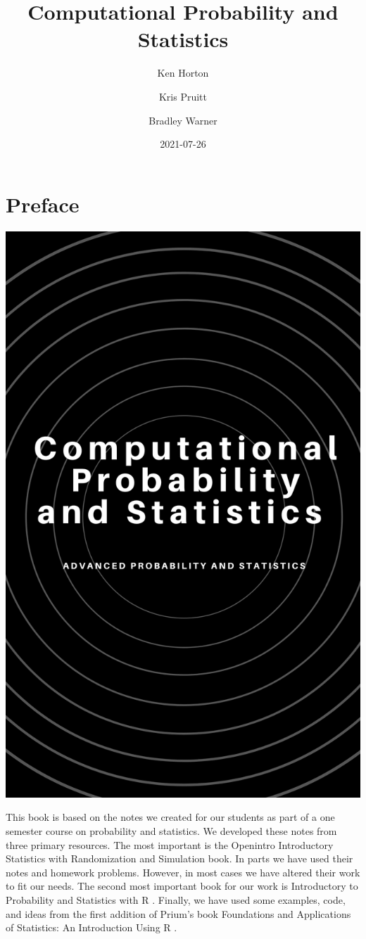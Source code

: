 \documentclass[
]{book}
\title{Computational Probability and Statistics}
\author{Ken Horton \and Kris Pruitt \and Bradley Warner}
\date{2021-07-26}
\begin{document}
\maketitle

{
\setcounter{tocdepth}{1}
\tableofcontents
}
\hypertarget{preface}{%
\chapter*{Preface}\label{preface}}

\includegraphics[width=19.58in]{./figures/Cover}

This book is based on the notes we created for our students as part of a one semester course on probability and statistics. We developed these notes from three primary resources. The most important is the Openintro Introductory Statistics with Randomization and Simulation \citep{ointrorand} book. In parts we have used their notes and homework problems. However, in most cases we have altered their work to fit our needs. The second most important book for our work is Introductory to Probability and Statistics with R \citep{ipsur}. Finally, we have used some examples, code, and ideas from the first addition of Prium's book Foundations and Applications of Statistics: An Introduction Using R \citep{pruim2011foundations}.
\end{document}
